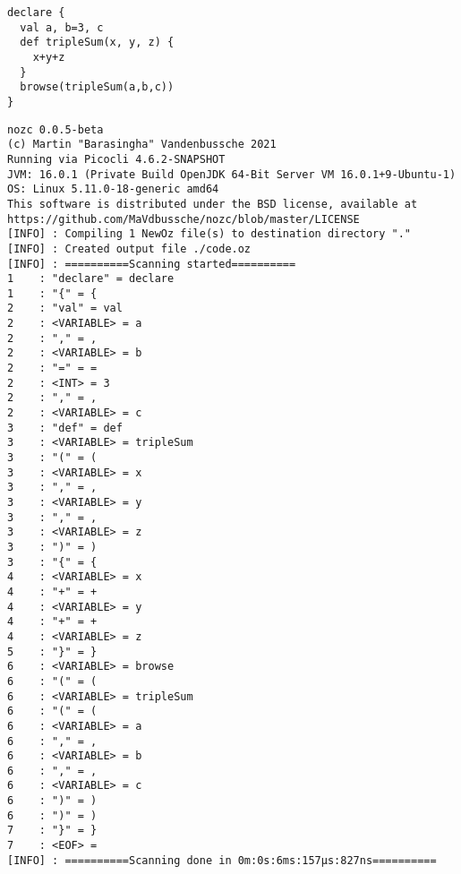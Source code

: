 \begin{lstlisting}[language=newoz,label={lst:compilation-in},title={Input code in \textit{NewOz}}]
declare {
  val a, b=3, c
  def tripleSum(x, y, z) {
    x+y+z
  }
  browse(tripleSum(a,b,c))
}
\end{lstlisting}
\begin{lstlisting}[label={lst:compilation-t},title={Output of the command "\texttt{\$ nozc code.nozc -t}", demonstrating the first part of the compilation (lexer/tokenizer)}]
nozc 0.0.5-beta
(c) Martin "Barasingha" Vandenbussche 2021
Running via Picocli 4.6.2-SNAPSHOT
JVM: 16.0.1 (Private Build OpenJDK 64-Bit Server VM 16.0.1+9-Ubuntu-1)
OS: Linux 5.11.0-18-generic amd64
This software is distributed under the BSD license, available at https://github.com/MaVdbussche/nozc/blob/master/LICENSE
[INFO] : Compiling 1 NewOz file(s) to destination directory "."
[INFO] : Created output file ./code.oz
[INFO] : ==========Scanning started==========
1	 : "declare" = declare
1	 : "{" = {
2	 : "val" = val
2	 : <VARIABLE> = a
2	 : "," = ,
2	 : <VARIABLE> = b
2	 : "=" = =
2	 : <INT> = 3
2	 : "," = ,
2	 : <VARIABLE> = c
3	 : "def" = def
3	 : <VARIABLE> = tripleSum
3	 : "(" = (
3	 : <VARIABLE> = x
3	 : "," = ,
3	 : <VARIABLE> = y
3	 : "," = ,
3	 : <VARIABLE> = z
3	 : ")" = )
3	 : "{" = {
4	 : <VARIABLE> = x
4	 : "+" = +
4	 : <VARIABLE> = y
4	 : "+" = +
4	 : <VARIABLE> = z
5	 : "}" = }
6	 : <VARIABLE> = browse
6	 : "(" = (
6	 : <VARIABLE> = tripleSum
6	 : "(" = (
6	 : <VARIABLE> = a
6	 : "," = ,
6	 : <VARIABLE> = b
6	 : "," = ,
6	 : <VARIABLE> = c
6	 : ")" = )
6	 : ")" = )
7	 : "}" = }
7	 : <EOF> =
[INFO] : ==========Scanning done in 0m:0s:6ms:157µs:827ns==========
\end{lstlisting}
